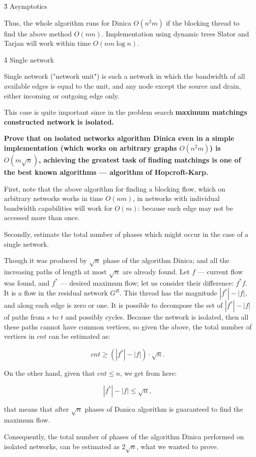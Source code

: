 \h3{ Asymptotics }

Thus, the whole algorithm runs for Dinica $O (n^2 m)$ if the blocking thread to find the above method $O (n m)$. Implementation using dynamic trees Slator and Tarjan will work within time $O (n m \log n)$.

\h4{ Single network }

Single network ("network unit") is such a network in which the bandwidth of all available edges is equal to the unit, and any node except the source and drain, either incoming or outgoing edge only.

This case is quite important since in the problem search \bf{maximum matchings} constructed network is isolated.

\bf{Prove} that on isolated networks algorithm Dinica even in a simple implementation (which works on arbitrary graphs $O (n^2 m)$) is $O (m \sqrt{n})$, achieving the greatest task of finding matchings is one of the best known algorithms --- algorithm of Hopcroft-Karp.

First, note that the above algorithm for finding a blocking flow, which on arbitrary networks works in time $O (n m)$, in networks with individual bandwidth capabilities will work for $O (m)$: because each edge may not be accessed more than once.

Secondly, estimate the total number of phases which might occur in the case of a single network.

Though it was produced by $\sqrt{n}$ phase of the algorithm Dinica; and all the increasing paths of length at most $\sqrt{n}$ are already found. Let $f$ --- current flow was found, and $f^*$ --- desired maximum flow; let us consider their difference: $f^* f$. It is a flow in the residual network $G^R$. This thread has the magnitude $|f^*| - |f|$, and along each edge is zero or one. It is possible to decompose the set of $|f^*| - |f|$ of paths from $s$ to $t$ and possibly cycles. Because the network is isolated, then all these paths cannot have common vertices, so given the above, the total number of vertices in $cnt$ can be estimated as:

$$ cnt \ge (|f^*| - |f|) \cdot \sqrt{n}. $$

On the other hand, given that $cnt \le n$, we get from here:

$$ |f^*| - |f| \le \sqrt{n}, $$

that means that after $\sqrt{n}$ phases of Danica algorithm is guaranteed to find the maximum flow.

Consequently, the total number of phases of the algorithm Dinica performed on isolated networks, can be estimated as $2 \sqrt{n}$, what we wanted to prove.



